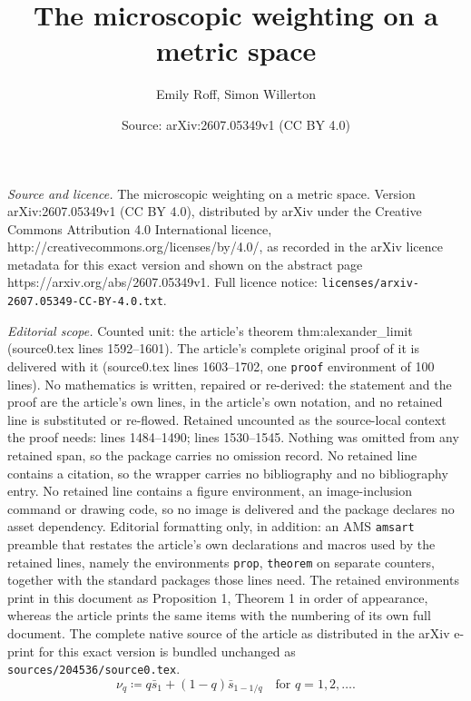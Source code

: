 \documentclass[10pt,a4paper]{amsart}
\title{The microscopic weighting on a metric space}
\author{Emily Roff, Simon Willerton}
\date{Source: arXiv:2607.05349v1 (CC BY 4.0)}
\begin{document}
\maketitle

\noindent\emph{Source and licence.} The microscopic weighting on a metric space. Version arXiv:2607.05349v1 (CC BY 4.0), distributed by arXiv under the Creative Commons Attribution 4.0 International licence, http://creativecommons.org/licenses/by/4.0/, as recorded in the arXiv licence metadata for this exact version and shown on the abstract page https://arxiv.org/abs/2607.05349v1. Full licence notice: \texttt{licenses/arxiv-2607.05349-CC-BY-4.0.txt}.\par\smallskip

\noindent\textit{Editorial scope.} Counted unit: the article's theorem thm:alexander\_limit (source0.tex lines 1592--1601). The article's complete original proof of it is delivered with it (source0.tex lines 1603--1702, one \texttt{proof} environment of 100 lines). No mathematics is written, repaired or re-derived: the statement and the proof are the article's own lines, in the article's own notation, and no retained line is substituted or re-flowed.  Retained uncounted as the source-local context the proof needs: lines 1484--1490; lines 1530--1545.  Nothing was omitted from any retained span, so the package carries no omission record.  No retained line contains a citation, so the wrapper carries no bibliography and no bibliography entry.  No retained line contains a figure environment, an image-inclusion command or drawing code, so no image is delivered and the package declares no asset dependency.  Editorial formatting only, in addition: an AMS \texttt{amsart} preamble that restates the article's own declarations and macros used by the retained lines, namely the environments \texttt{prop}, \texttt{theorem} on separate counters, together with the standard packages those lines need.  The retained environments print in this document as Proposition 1, Theorem 1 in order of appearance, whereas the article prints the same items with the numbering of its own full document.  The complete native source of the article as distributed in the arXiv e-print for this exact version is bundled unchanged as \texttt{sources/204536/source0.tex}.
\begin{equation}
\label{eq:Alexander-family}
    \nu_q \coloneq q \bar{s}_1 + (1 - q) \bar{s}_{1-1/q}
    \quad
    \text{for }
    q = 1, 2, \dots.
\end{equation}
\end{document}
